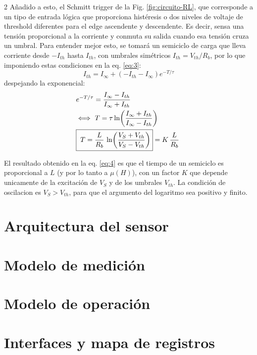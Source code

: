\documentclass[11pt,letterpaper]{article}
\begin{document}
\begin{multicols*}{2}
Añadido a esto, el Schmitt trigger de la Fig. \ref{fig:circuito-RL}, que corresponde a un tipo de entrada lógica que proporciona histéresis o dos niveles de voltaje de threshold diferentes para el edge ascendente y descendente. Es decir, sensa una tensión proporcional a la corriente y conmuta su salida cuando esa tensión cruza un umbral. Para entender mejor esto, se tomará un semiciclo de carga que lleva corriente desde $-I_{th}$ hasta $I_{th}$, con umbrales simétricos $I_{th} = V_{th}/R_b$, por lo que imponiendo estas condiciones en la eq. \ref{eq:3}:
\begin{equation*}
    I_{th} = I_{\infty} + (-I_{th}-I_{\infty})e^{-T/\tau}
\end{equation*}
despejando la exponencial:
\begin{align}
    &e^{-T/\tau}
        = \dfrac{I_{\infty} - I_{th}}{I_{\infty} + I_{th}} \notag \\
    &\Longleftrightarrow\ T
        = \tau \ln\!\left(\dfrac{I_{\infty} + I_{th}}{I_{\infty} - I_{th}}\right) \notag \\
    &\boxed{\;T = \dfrac{L}{R_b}\,
        \ln\!\left(\dfrac{V_S + V_{th}}{V_S - V_{th}}\right)
        }= K\,\dfrac{L}{R_b}\;
    \label{eq:4}
\end{align}

El resultado obtenido en la eq. \ref{eq:4} es que el tiempo de un semiciclo es proporcional a $L$ (y por lo tanto a $\mu(H)$), con un factor $K$ que depende unicamente de la excitación de $V_S$ y de los umbrales $V_{th}$. La condición de oscilacion es $V_S > V_{th}$, para que el argumento del logaritmo sea positivo y finito.


\section{Arquitectura del sensor}

\section{Modelo de medición}

\section{Modelo de operación}

\section{Interfaces y mapa de registros}


\end{multicols*}
\end{document}
